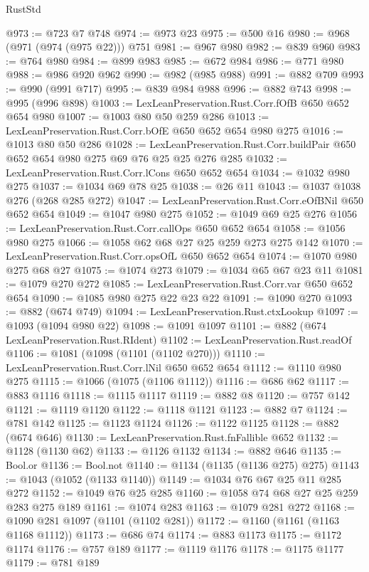\begin{lexlean}{RustStd}
\begin{coremodule}
{\begin{coremodule}
{{{{{{{@973 := @723 @7 @748
@974 := @973 @23
@975 := @500 @16
@980 := @968 (@971 (@974 (@975 @22))) @751
@981 := @967 @980
@982 := @839 @960
@983 := @764 @980
@984 := @899 @983
@985 := @672 @984
@986 := @771 @980
@988 := @986 @920 @962
@990 := @982 (@985 @988)
@991 := @882 @709
@993 := @990 (@991 @717)
@995 := @839 @984 @988
@996 := @882 @743
@998 := @995 (@996 @898)
@1003 := LexLeanPreservation.Rust.Corr.fOfB @650 @652 @654 @980
@1007 := @1003 @80 @50 @259 @286
@1013 := LexLeanPreservation.Rust.Corr.bOfE @650 @652 @654 @980 @275
@1016 := @1013 @80 @50 @286
@1028 := LexLeanPreservation.Rust.Corr.buildPair @650 @652 @654 @980 @275 @69 @76 @25 @25 @276 @285
@1032 := LexLeanPreservation.Rust.Corr.lCons @650 @652 @654
@1034 := @1032 @980 @275
@1037 := @1034 @69 @78 @25
@1038 := @26 @11
@1043 := @1037 @1038 @276 (@268 @285 @272)
@1047 := LexLeanPreservation.Rust.Corr.eOfBNil @650 @652 @654
@1049 := @1047 @980 @275
@1052 := @1049 @69 @25 @276
@1056 := LexLeanPreservation.Rust.Corr.callOps @650 @652 @654
@1058 := @1056 @980 @275
@1066 := @1058 @62 @68 @27 @25 @259 @273 @275 @142
@1070 := LexLeanPreservation.Rust.Corr.opsOfL @650 @652 @654
@1074 := @1070 @980 @275 @68 @27
@1075 := @1074 @273
@1079 := @1034 @65 @67 @23 @11
@1081 := @1079 @270 @272
@1085 := LexLeanPreservation.Rust.Corr.var @650 @652 @654
@1090 := @1085 @980 @275 @22 @23 @22
@1091 := @1090 @270
@1093 := @882 (@674 @749)
@1094 := LexLeanPreservation.Rust.ctxLookup
@1097 := @1093 (@1094 @980 @22)
@1098 := @1091 @1097
@1101 := @882 (@674 LexLeanPreservation.Rust.RIdent)
@1102 := LexLeanPreservation.Rust.readOf
@1106 := @1081 (@1098 (@1101 (@1102 @270)))
@1110 := LexLeanPreservation.Rust.Corr.lNil @650 @652 @654
@1112 := @1110 @980 @275
@1115 := @1066 (@1075 (@1106 @1112))
@1116 := @686 @62
@1117 := @883 @1116
@1118 := @1115 @1117
@1119 := @882 @8
@1120 := @757 @142
@1121 := @1119 @1120
@1122 := @1118 @1121
@1123 := @882 @7
@1124 := @781 @142
@1125 := @1123 @1124
@1126 := @1122 @1125
@1128 := @882 (@674 @646)
@1130 := LexLeanPreservation.Rust.fnFallible @652
@1132 := @1128 (@1130 @62)
@1133 := @1126 @1132
@1134 := @882 @646
@1135 := Bool.or
@1136 := Bool.not
@1140 := @1134 (@1135 (@1136 @275) @275)
@1143 := @1043 (@1052 (@1133 @1140))
@1149 := @1034 @76 @67 @25 @11 @285 @272
@1152 := @1049 @76 @25 @285
@1160 := @1058 @74 @68 @27 @25 @259 @283 @275 @189
@1161 := @1074 @283
@1163 := @1079 @281 @272
@1168 := @1090 @281 @1097 (@1101 (@1102 @281))
@1172 := @1160 (@1161 (@1163 @1168 @1112))
@1173 := @686 @74
@1174 := @883 @1173
@1175 := @1172 @1174
@1176 := @757 @189
@1177 := @1119 @1176
@1178 := @1175 @1177
@1179 := @781 @189
}}}}}}}
\end{coremodule}}
\end{coremodule}
\end{lexlean}
